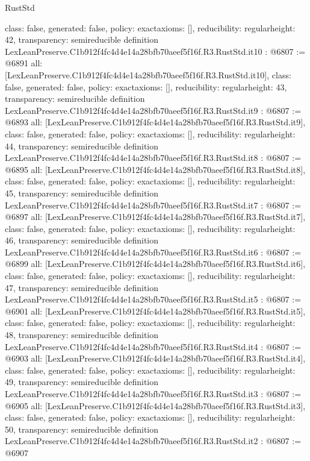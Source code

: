 \begin{lexlean}{RustStd}
\begin{coremodule}
{  class: false,
  generated: false,
  policy: exact{axioms: []},
  reducibility: regular{height: 42},
  transparency: semireducible
}
definition LexLeanPreserve.C1b912f4fc4d4e14a28bfb70aeef5f16f.R3.RustStd.it10 : @6807 := @6891 {
  all: [LexLeanPreserve.C1b912f4fc4d4e14a28bfb70aeef5f16f.R3.RustStd.it10],
  class: false,
  generated: false,
  policy: exact{axioms: []},
  reducibility: regular{height: 43},
  transparency: semireducible
}
definition LexLeanPreserve.C1b912f4fc4d4e14a28bfb70aeef5f16f.R3.RustStd.it9 : @6807 := @6893 {
  all: [LexLeanPreserve.C1b912f4fc4d4e14a28bfb70aeef5f16f.R3.RustStd.it9],
  class: false,
  generated: false,
  policy: exact{axioms: []},
  reducibility: regular{height: 44},
  transparency: semireducible
}
definition LexLeanPreserve.C1b912f4fc4d4e14a28bfb70aeef5f16f.R3.RustStd.it8 : @6807 := @6895 {
  all: [LexLeanPreserve.C1b912f4fc4d4e14a28bfb70aeef5f16f.R3.RustStd.it8],
  class: false,
  generated: false,
  policy: exact{axioms: []},
  reducibility: regular{height: 45},
  transparency: semireducible
}
definition LexLeanPreserve.C1b912f4fc4d4e14a28bfb70aeef5f16f.R3.RustStd.it7 : @6807 := @6897 {
  all: [LexLeanPreserve.C1b912f4fc4d4e14a28bfb70aeef5f16f.R3.RustStd.it7],
  class: false,
  generated: false,
  policy: exact{axioms: []},
  reducibility: regular{height: 46},
  transparency: semireducible
}
definition LexLeanPreserve.C1b912f4fc4d4e14a28bfb70aeef5f16f.R3.RustStd.it6 : @6807 := @6899 {
  all: [LexLeanPreserve.C1b912f4fc4d4e14a28bfb70aeef5f16f.R3.RustStd.it6],
  class: false,
  generated: false,
  policy: exact{axioms: []},
  reducibility: regular{height: 47},
  transparency: semireducible
}
definition LexLeanPreserve.C1b912f4fc4d4e14a28bfb70aeef5f16f.R3.RustStd.it5 : @6807 := @6901 {
  all: [LexLeanPreserve.C1b912f4fc4d4e14a28bfb70aeef5f16f.R3.RustStd.it5],
  class: false,
  generated: false,
  policy: exact{axioms: []},
  reducibility: regular{height: 48},
  transparency: semireducible
}
definition LexLeanPreserve.C1b912f4fc4d4e14a28bfb70aeef5f16f.R3.RustStd.it4 : @6807 := @6903 {
  all: [LexLeanPreserve.C1b912f4fc4d4e14a28bfb70aeef5f16f.R3.RustStd.it4],
  class: false,
  generated: false,
  policy: exact{axioms: []},
  reducibility: regular{height: 49},
  transparency: semireducible
}
definition LexLeanPreserve.C1b912f4fc4d4e14a28bfb70aeef5f16f.R3.RustStd.it3 : @6807 := @6905 {
  all: [LexLeanPreserve.C1b912f4fc4d4e14a28bfb70aeef5f16f.R3.RustStd.it3],
  class: false,
  generated: false,
  policy: exact{axioms: []},
  reducibility: regular{height: 50},
  transparency: semireducible
}
definition LexLeanPreserve.C1b912f4fc4d4e14a28bfb70aeef5f16f.R3.RustStd.it2 : @6807 := @6907 {
}
\end{coremodule}
\end{lexlean}
